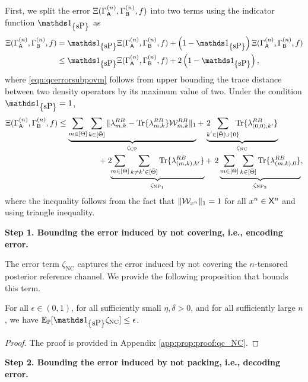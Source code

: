 First, we split the error $ \Xi(\Gamma^{(n)}_{\mathsf{A}},\Gamma^{(n)}_{\mathsf{B}},f) $ into two terms using the indicator function $\I_{\curly{\mbox{\normalfont sP}}}$ as 
\begin{align}
\error&=\I_{\curly{\mbox{\normalfont sP}}} 
\error + \round{1- \I_{\curly{\mbox{\normalfont sP}}}}\error\\
&\leq \I_{\curly{\mbox{\normalfont sP}}} 
\error  + 2\round{1- \I_{\curly{\mbox{\normalfont sP}}}} \label{eqn:qcerrorsubpovm},
\end{align}
where \eqref{eqn:qcerrorsubpovm} follows from upper bounding the trace distance between two density operators by its maximum value of two. 
Under the condition $\I_{\curly{\mbox{\normalfont sP}}} = 1$, 
 \begin{align*}
     \error &\overset{}{\leq} \underbrace{\sum_{m \in [\Theta]}\sum_{\substack{k\in [\bTheta]}}\|\lambda_{m,k}^{\refe B} -  \Tr\{\lambda_{m,k}^{\refe B}\}\calW_{m,k}^{\refe B}\|_1}_{\zeta_{\text{CP}}} 
     + \ 2 \!\!\!\!\underbrace{\sum_{\substack{k'\in [\bTheta]\cup \{0\}}}\!\!\!\! \Tr\{\lambda_{(0,0),k'}^{\refe B}\}}_{\zeta_{\text{NC}}}
     \\
     &\hspace{50pt}+2\!\!\underbrace{\sum_{m \in [\Theta]}\sum_{\substack{k \neq k' \in [\bTheta]}}  \Tr\{\lambda_{(m,k),k'}^{\refe B}\}}_{\zeta_{\text{NP}_1}}  +   \ 2\underbrace{\sum_{m \in [\Theta]}\sum_{\substack{k\in [\bTheta]}} \Tr\{\lambda_{(m,k),0}^{\refe B}\}}_{\zeta_{\text{NP}_2}},
 \end{align*}
 where the inequality follows from the fact that $\|\mathcal{W}_{x^n}\|_1=1$ for all $x^n\in \mathsf{X}^n$ and  using triangle inequality.


\noindent \textbf{Step 1. Bounding the error induced by not covering, i.e., encoding error.} 

\noindent The error term $\zeta_{\text{NC}}$ captures the error induced by not covering the $n$-tensored posterior reference channel. We provide the following proposition that bounds this term.  
\begin{prop}\label{prop:qc_NC}
    For all $\epsilon\in(0,1)$, for all sufficiently small $\eta, \delta>0$, and for all sufficiently large $n$, we have $\EE_\PP[\I_{\curly{\mbox{\normalfont sP}}}\zeta_{\text{NC}}]\leq \epsilon$.
\end{prop}
\begin{proof}
The proof is provided in Appendix \ref{app:prop:proof:qc_NC}.
\end{proof}
\noindent \textbf{Step 2. Bounding the error induced by not packing, i.e., decoding error.} 

